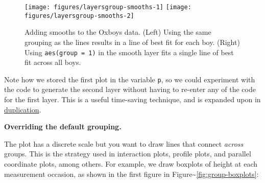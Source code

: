 \begin{Shaded}
\begin{Highlighting}[]
 \NormalTok{) +}
\StringTok{  }\NormalTok{(}\NormalTok{, } 
 \NormalTok{) +}
\StringTok{  }\NormalTok{(}\NormalTok{(} \NormalTok{), }\NormalTok{, } \NormalTok{, } 
\end{Highlighting}
\end{Shaded}

\begin{figure}
\texttt{[image: figures/layersgroup-smooths-1]} \texttt{[image: figures/layersgroup-smooths-2]} \caption{Adding smooths to the Oxboys data.  (Left) Using the same grouping as the lines results in a line of best fit for each boy.  (Right) Using \texttt{aes(group = 1)} in the smooth layer fits a single line of best fit across all boys.\label{fig:group-smooths}}
\end{figure}

Note how we stored the first plot in the variable \texttt{p}, so we
could experiment with the code to generate the second layer without
having to re-enter any of the code for the first layer. This is a useful
time-saving technique, and is expanded upon in
\hyperref[cha:duplication]{duplication}.

\textbf{Overriding the default grouping.}

The plot has a discrete scale but you want to draw lines that connect
\emph{across} groups. This is the strategy used in interaction plots,
profile plots, and parallel coordinate plots, among others. For example,
we draw boxplots of height at each measurement occasion, as shown in the
first figure in Figure\textasciitilde{}\ref{fig:group-boxplots}:

\begin{Shaded}
\begin{Highlighting}[]
\StringTok{ }\StringTok{ }\NormalTok{()}
\end{Highlighting}
\end{Shaded}


